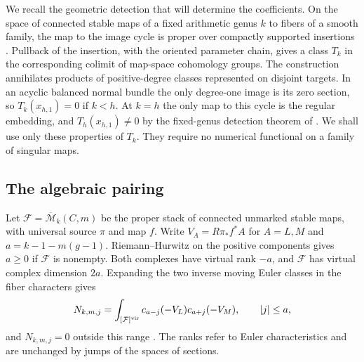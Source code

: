 We recall the geometric detection that will determine the coefficients.
On the space of connected stable maps of a fixed arithmetic genus $k$
to fibers of a smooth family, the map to the image cycle is proper
over compactly supported insertions \cite[\S5]{WueProduct}. Pullback of
the insertion, with the oriented parameter chain, gives a class
$T_k$ in the corresponding colimit of map-space cohomology groups.
The construction annihilates products of positive-degree classes
represented on disjoint targets. In an acyclic balanced normal bundle
the only degree-one image is its zero section, so
$T_k(x_{h,1})=0$ if $k<h$. At $k=h$ the only map to this cycle is
the regular embedding, and $T_h(x_{h,1})\ne0$ by the fixed-genus
detection theorem of \cite[\S\S5--6]{WueProduct}. We shall use only
these properties of $T_k$. They require no numerical functional on a
family of singular maps.

\subsection{The algebraic pairing}
Let $\mathcal F=\overline{\mathcal M}_k(C,m)$ be the proper stack of
connected unmarked stable maps, with universal source $\pi$ and map
$f$. Write $V_A=R\pi_*f^*A$ for $A=L,M$ and
$a=k-1-m(g-1)$. Riemann--Hurwitz on the positive components gives
$a\ge0$ if $\mathcal F$ is nonempty. Both complexes have virtual
rank $-a$, and $\mathcal F$ has virtual complex dimension $2a$.
Expanding the two inverse moving Euler classes in the fiber
characters gives
\begin{equation}\label{eq:chern}
 N_{k,m,j}=
  \int_{[\mathcal F]^{\rm vir}}
    c_{a-j}(-V_L)c_{a+j}(-V_M),\qquad |j|\le a ,
\end{equation}
and $N_{k,m,j}=0$ outside this range
\cite[\S2]{BP}. The ranks refer to Euler characteristics and are
unchanged by jumps of the spaces of sections.

